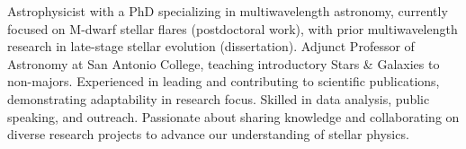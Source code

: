 \documentclass[12pt]{article}
\begin{document}
\noindent Astrophysicist with a PhD specializing in multiwavelength astronomy, currently focused on M-dwarf stellar flares (postdoctoral work), with prior multiwavelength research in late-stage stellar evolution (dissertation). Adjunct Professor of Astronomy at San Antonio College, teaching introductory Stars \& Galaxies to non-majors. Experienced in leading and contributing to scientific publications, demonstrating adaptability in research focus. Skilled in data analysis, public speaking, and outreach. Passionate about sharing knowledge and collaborating on diverse research projects to advance our understanding of stellar physics.\\

\end{document}
